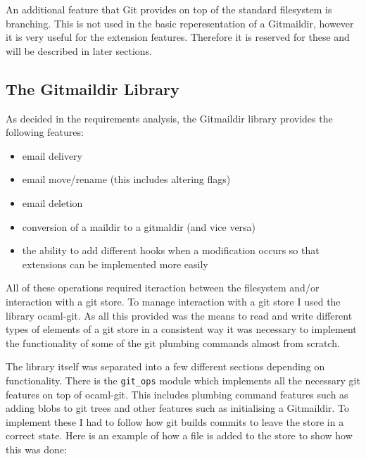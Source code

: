 An additional feature that Git provides on top of the standard filesystem is branching. This is not used in the basic reperesentation of a Gitmaildir, however it is very useful for the extension features. Therefore it is reserved for these and will be described in later sections. 

\subsection{The Gitmaildir Library}

As decided in the requirements analysis, the Gitmaildir library provides the following features:

\begin{itemize}
\item email delivery
\item email move/rename (this includes altering flags)
\item email deletion
\item conversion of a maildir to a gitmaldir (and vice versa)
\item the ability to add different hooks when a modification occurs so that extensions can be implemented more easily
\end{itemize}

All of these operations required iteraction between the filesystem and/or interaction with a git store. To manage interaction with a git store I used the library ocaml-git. As all this provided was the means to read and write different types of elements of a git store in a consistent way it was necessary to implement the functionality of some of the git plumbing commands almost from scratch.

The library itself was separated into a few different sections depending on functionality. There is the \texttt{git\_ops} module which implements all the necessary git features on top of ocaml-git. This includes plumbing command features such as adding blobs to git trees and other features such as initialising a Gitmaildir. To implement these I had to follow how git builds commits to leave the store in a correct state. Here is an example of how a file is added to the store to show how this was done:

